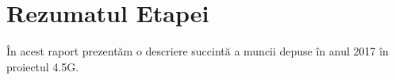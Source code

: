 \chapter{Rezumatul Etapei}

În acest raport prezentăm o descriere succintă a muncii depuse în anul 2017 în
proiectul 4.5G. 



